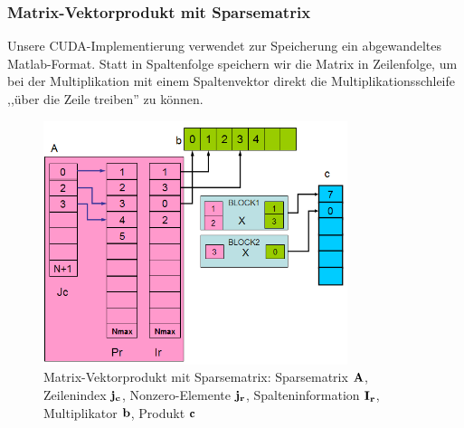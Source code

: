 
\subsubsection{Matrix-Vektorprodukt mit Sparsematrix}





Unsere CUDA-Implementierung verwendet zur Speicherung ein abgewandeltes
Matlab-Format. Statt in Spaltenfolge speichern wir die Matrix
in Zeilenfolge, um bei der Multiplikation mit einem Spaltenvektor direkt
die Multiplikationsschleife ,,über die Zeile treiben'' zu können.

\begin{figure}[htbp]
\includegraphics[width=3.5in]{../xby/pic//sparseMul}
\caption{Matrix-Vektorprodukt mit Sparsematrix: Sparsematrix $\bf A $, Zeilenindex $ \bf j_c$, Nonzero-Elemente $\bf j_r$,  Spalteninformation $ \bf I_r$, Multiplikator $\bf b$, Produkt $\bf c$}
\label{sparseMul}
\end{figure}